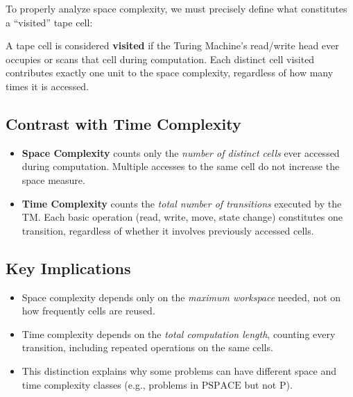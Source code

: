 To properly analyze space complexity, we must precisely define what constitutes a ``visited'' tape cell:

\begin{definition}
A tape cell is considered \textbf{visited} if the Turing Machine's read/write head ever occupies or scans that cell during computation. Each distinct cell visited contributes exactly one unit to the space complexity, regardless of how many times it is accessed.
\end{definition}

\subsection{Contrast with Time Complexity}
\begin{itemize}
    \item \textbf{Space Complexity} counts only the \textit{number of distinct cells} ever accessed during computation. Multiple accesses to the same cell do not increase the space measure.

    \item \textbf{Time Complexity} counts the \textit{total number of transitions} executed by the TM. Each basic operation (read, write, move, state change) constitutes one transition, regardless of whether it involves previously accessed cells.

\end{itemize}

\subsection{Key Implications}
\begin{itemize}
    \item Space complexity depends only on the \textit{maximum workspace} needed, not on how frequently cells are reused.

    \item Time complexity depends on the \textit{total computation length}, counting every transition, including repeated operations on the same cells.

    \item This distinction explains why some problems can have different space and time complexity classes (e.g., problems in $\text{PSPACE}$ but not $\text{P}$).
\end{itemize}

